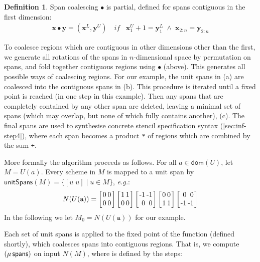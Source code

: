 \documentclass[10pt,preprint,numbers]{sigplanconf}
\newcounter{block}
\theoremstyle{definition}
\newtheorem{definition}[block]{Definition}
\newcommand{\eg}{\emph{e.g.}}
\newcommand{\vect}[1]{\textbf{#1}}
\newcommand{\vtwo}[2]{\setlength{\arraycolsep}{0em}
\left[\begin{array}{l}#1\\#2\end{array}\right]}
\newcommand{\stwo}[4]
{\setlength{\arraycolsep}{0.1em}
\left[\begin{array}{rr}$#1$ & $#3$\\$#2$ & $#4$\end{array}\right]}
\begin{document}
\begin{definition}\label{def:span-coalesc}
  Span coalescing $\bullet$ is partial, defined for spans contiguous in the
  first dimension:
\begin{align*}
\vect{x} \bullet \vect{y}
= (\vect{x}^L, \vect{y}^U) \;\;\;\, \textit{if} \;\;\; \vect{x}^U_1 + 1 = \vect{y}^L_1 \; \wedge \;
\vect{x}_{2:n} = \vect{y}_{2:n} %
\end{align*}
\end{definition}
\noindent
To coalesce regions which are contiguous in other dimensions
other than the first, we generate all rotations of the spans in
$n$-dimensional space by permutation on spans, and fold together contiguous
regions using $\bullet$ (above). This
generates all possible ways of coalescing regions. For our example,
the unit spans in (a)
are coalesced into the contiguous spans in
(b).
This procedure is iterated until a fixed point is reached (in one step
in this example).
 Then any spans that are completely contained by any other span are deleted,
leaving a minimal set of spans (which may overlap, but none of which
fully contains another), (c).
The final spans are used to synthesise concrete stencil specification
syntax (\cref{sec:inf-step4}), where
each span becomes a product \texttt{*} of regions which are
combined by the sum \texttt{+}.

More formally the algorithm proceeds as follows.
For all $a \in \mathsf{dom}(U)$, let $M = U(a)$. Every scheme in $M$
is mapped to a unit span
by $\textsf{unitSpans}(M) = \{[u \; u] \mid u\!\in\!M\}$, \eg{}:
\begin{align*}
  N(U(\texttt{a})) = \stwo{0}{0}{0}{0} \stwo{1}{0}{1}{0} \stwo{-1}{0}{-1}{0} \stwo{0}{1}{0}{1} \stwo{0}{-1}{0}{-1}
\end{align*}
In the following we let $M_0 = N(U(\texttt{a}))$ for our example.

Each set of unit spans is applied to the fixed point of the \spanOp{} function
(defined shortly), which coalesces spans into contiguous regions. That is, we compute
 $(\mu \, \textsf{spans})$ on input $N(M)$, where \spanOp{} is defined by the steps:
\end{document}
